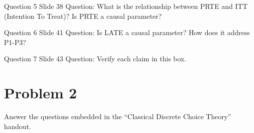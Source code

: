 \documentclass{article}
\begin{document}
\begin{problem}{Question 5 Slide 38}
Question: What is the relationship between PRTE and ITT (Intention To Treat)? Is PRTE a causal parameter?
\end{problem}
\begin{solution}
\end{solution}


\begin{problem}{Question 6 Slide 41}
Question: Is LATE a causal parameter? How does it address P1-P3?
\end{problem}
\begin{solution}
\end{solution}

\begin{problem}{Question 7 Slide 43}
Question: Verify each claim in this box.
\end{problem}
\begin{solution}
\end{solution}



\newpage
\section*{Problem 2}
Answer the questions embedded in the ``Classical Discrete Choice Theory'' handout.
\end{document}
